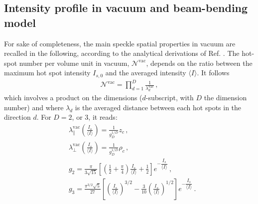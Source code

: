 \documentclass[%
 reprint,
 amsmath,amssymb,
 aps,
]{revtex4-1}
\begin{document}
\subsection{Intensity profile in vacuum and beam-bending model}
For sake of completeness, the main speckle spatial properties in vacuum are recalled in the following, according to the analytical derivations of Ref. \cite{Garnier_1999}. 
The hot-spot number per volume unit in vacuum, $\mathcal{N}^\mathrm{vac} $, depends on the ratio between the maximum hot spot intensity $ I_{s,0}$ and the averaged intensity $\langle I \rangle$. It follows 
\begin{align}
\mathcal{N}^\mathrm{vac} =\prod_{d=1}^{D}   \frac{1}{\lambda^\mathrm{vac}_d}   \, ,\label{eq:ncal} 
\end{align}
which involves a product on the dimensions ($d$-subscript, with $D$ the dimension number) and where $\lambda_d$ is the averaged distance between each hot spots in the direction $d$.
For $D =2$, or $3$, it reads:
\begin{align}
&\lambda^\mathrm{vac}_\parallel\left( \frac{I_{s}}{ \langle I \rangle }   \right)=\frac{1}{g_D^{1/D} }  z_c  \, ,\label{eq:ldx} \\
&\lambda^\mathrm{vac}_\perp \left( \frac{ I_{s}}{ \langle I \rangle }   \right)=\frac{1}{g_D^{1/D} }  \rho_c  \, ,\label{eq:ldy} \\
&g_{2} = \frac{\pi}{ 3\sqrt{15} }\left[ \left( \frac{1}{ 2 } +\frac{\pi}{ 4 }\right)\frac{I_{s}}{ \langle I \rangle }  +\frac{1}{ 2 } \right] e^{- \dfrac{ I_{s}}{ \langle I \rangle }  }  \, ,\label{eq:f2} \\
&g_{3} = \frac{\pi^{3/2}\sqrt{5}}{ 27 }\left[ \left( \frac{ I_{s}}{ \langle I \rangle }   \right)^{3/2} -\frac{3}{ 10 } \left( \frac{ I_{s}}{ \langle I \rangle }   \right)^{1/2}  \right] e^{- \dfrac{ I_{s}}{ \langle I \rangle }  } \, . \label{eq:f3} 
\end{align}
\end{document}
